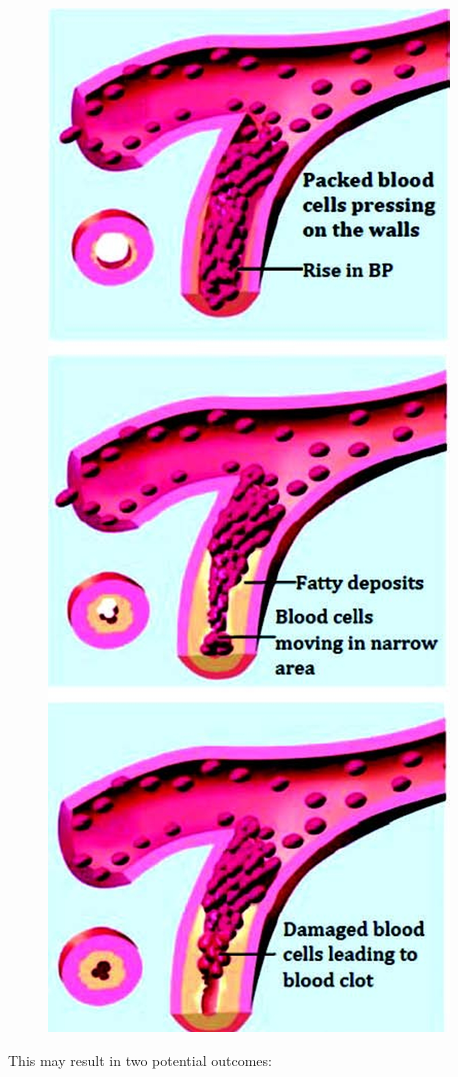 {\begin{figure}
\includegraphics{images/042.jpg}
\end{figure}

This may result in two potential outcomes:

}

